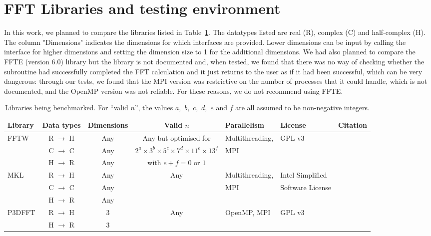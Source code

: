 \documentclass[a4]{article}
\begin{document}
\section{FFT Libraries and testing environment}\label{Sec:libs}

In this work, we planned to compare the libraries listed in Table~\ref{Tbl:libs}. 
The datatypes listed are real (R), complex (C) and half-complex (H). The column 
"Dimensions" indicates the dimensions for which interfaces are provided. Lower 
dimensions can be input by calling the interface for higher dimensions and 
setting the dimension size to 1 for the additional dimensions. We had also planned 
to compare the FFTE (version 6.0) library but the library is not documented and, when tested, we 
found that there was no way of checking whether the subroutine had successfully 
completed the FFT calculation and it just returns to the user as if it had been 
successful, which can be very dangerous: through our tests, we found that the MPI version was 
restrictive on the number of processes that it could handle, which is not documented, 
and the OpenMP version was not reliable. For these reasons, we do not recommend using FFTE.

\begin{table}[h]
\begin{center}
\begin{small}
\begin{tabular}{|l|c|c|c|l|l|c|}
\hline
\textbf{Library} & \textbf{Data types} & \textbf{Dimensions} & \textbf{Valid $n$} & \textbf{Parallelism} & \textbf{License} & \textbf{Citation} \\ \hline
FFTW & R $\rightarrow$ H & Any   & Any but optimised for  & Multithreading, & GPL v3 & \cite{FFTW} \\
     & C $\rightarrow$ C & Any      & $2^a\times 3^b\times 5^c\times 7^d\times 11^e\times 13^f$ &  MPI & & \\
     & H $\rightarrow$ R & Any      & with $e+f = 0$ or $1$ & & & \\ \hline
MKL  & R $\rightarrow$ H & Any   & Any & Multithreading, & Intel Simplified & \cite{MKL} \\
     & C $\rightarrow$ C & Any      & & MPI & Software License & \\
     & H $\rightarrow$ R & Any   & & & & \\ \hline
P3DFFT & R $\rightarrow$ H & 3   & Any & OpenMP, MPI & GPL v3 & \cite{P3DFFT} \\
     & H $\rightarrow$ R & 3   & & & & \\ \hline

\end{tabular}
\caption{Libraries being benchmarked.  For ``valid $n$'', the values $a,$ $b,$ $c,$ $d,$ $e$ and $f$ are all assumed to be non-negative integers.}\label{Tbl:libs}
\end{small}
\end{center}
\end{table}
\end{document}
